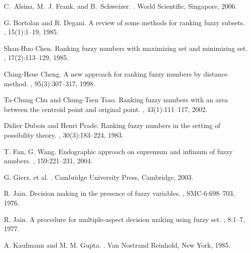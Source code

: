 \documentclass[preprint,3p,times]{elsarticle}
\theoremstyle{plain}
\theoremstyle{definition}
\numberwithin{equation}{section}
\begin{document}


% 
\begin{thebibliography}{}
C.~Alsina, M.~J. Frank, and B.~Schweizer.
.
\newblock World Scientific, Singapore, 2006.

G. Bortolan and R. Degani.
\newblock A review of some methods for ranking fuzzy subsets.
, 15(1):1--19, 1985.

Shan-Huo Chen.
\newblock Ranking fuzzy numbers with maximizing set and minimizing set.
, 17(2):113--129, 1985.

Ching-Hsue Cheng.
\newblock A new approach for ranking fuzzy numbers by distance method.
, 95(3):307--317, 1998.

Ta-Chung Chu and Chung-Tsen Tsao.
\newblock Ranking fuzzy numbers with an area between the centroid point and original point.
, 43(1):111--117, 2002.

Didier Dubois and Henri Prade.
\newblock Ranking fuzzy numbers in the setting of possibility theory.
, 30(3):183--224, 1983.

T. Fan, G. Wang.
\newblock Endographic approach on supremum and infimum of fuzzy numbers.
, 159:221--231, 2004.

G. Gierz, et al.
.
\newblock Cambridge University Press, Cambridge, 2003.


 R. Jain.
 \newblock Decision making in the presence of fuzzy variables.
 , SMC-6:698--703, 1976.

  R. Jain.
  \newblock A procedure for multiple-aspect decision making using fuzzy set.
  , 8:1--7, 1977.
  
A. Kaufmann and M. M. Gupta.
.
\newblock Van Nostrand Reinhold, New York, 1985.


\end{thebibliography}
\end{document}
